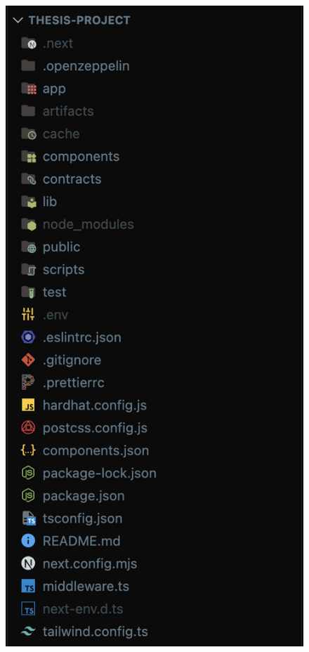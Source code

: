 \begin{figure}[htbp]
   \centering
   \begin{minipage}[ht]{0.4\textwidth}
       \centering
       \includegraphics[scale=0.3]{src/images/folder-structure.png}

\end{minipage}
\end{figure}
